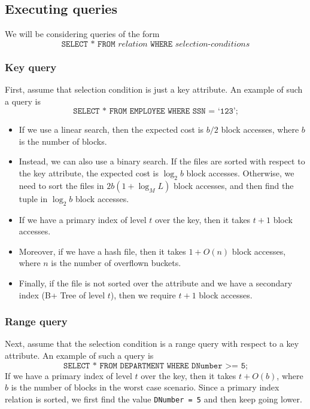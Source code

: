 \documentclass[a4paper, openany]{memoir}
\theoremstyle{definition}
\theoremstyle{plain}
\begin{document}
\subsection{Executing queries}
We will be considering queries of the form
\[\texttt{SELECT * FROM } \textit{relation} \texttt{ WHERE } \textit{selection-conditions}\]

\subsubsection{Key query}
First, assume that selection condition is just a key attribute. An example of such a query is
\[\texttt{SELECT * FROM EMPLOYEE WHERE SSN = `123';}\]
\begin{itemize}
    \item If we use a linear search, then the expected cost is $b/2$ block accesses, where $b$ is the number of blocks. 
    \item Instead, we can also use a binary search. If the files are sorted with respect to the key attribute, the expected cost is $\log_2 b$ block accesses. Otherwise, we need to sort the files in $2b(1 + \log_M L)$ block accesses, and then find the tuple in $\log_2 b$ block accesses.
    \item If we have a primary index of level $t$ over the key, then it takes $t + 1$ block accesses. 
    \item Moreover, if we have a hash file, then it takes $1 + O(n)$ block accesses, where $n$ is the number of overflown buckets.
    \item Finally, if the file is not sorted over the attribute and we have a secondary index (B+ Tree of level $t$), then we require $t + 1$ block accesses.
\end{itemize}

\subsubsection{Range query}
Next, assume that the selection condition is a range query with respect to a key attribute. An example of such a query is
\[\texttt{SELECT * FROM DEPARTMENT WHERE DNumber >= 5;}\]
If we have a primary index of level $t$ over the key, then it takes $t + O(b)$, where $b$ is the number of blocks in the worst case scenario. Since a primary index relation is sorted, we first find the value \texttt{DNumber = 5} and then keep going lower.
\end{document}
